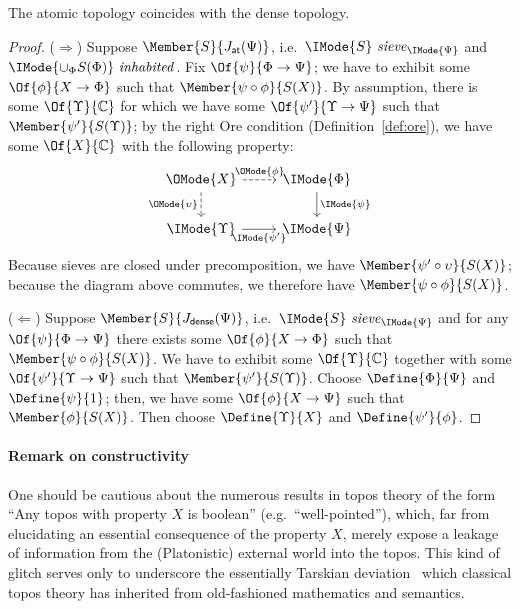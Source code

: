 \documentclass{article}
\newcommand\IsSieve[2]{\IMode{#2}\ \mathit{sieve}_{\IMode{#1}}}
\newcommand\JAtomic{J_{\mathsf{at}}}
\newcommand\JDense{J_{\mathsf{dense}}}
\newcommand\IsInh[1]{\IMode{#1}\ \mathit{inhabited}}
\begin{document}
\begin{lem}\label{lem:atomic-dense}
  The atomic topology coincides with the dense topology.
\end{lem}
\begin{proof}
  ($\Rightarrow$) Suppose $\Member{S}{\JAtomic(\Psi)}$, i.e.\
  $\IsSieve{\Psi}{S}$ and $\IsInh{\cup_\Phi S(\Phi)}$. Fix
  $\Of{\psi}{\Phi\to\Psi}$; we have to exhibit some
  $\Of{\phi}{X\to\Phi}$ such that $\Member{\psi\circ\phi}{S(X)}$.
  By assumption, there is some $\Of{\Upsilon}{\mathbb{C}}$ for which we
  have some $\Of{\psi'}{\Upsilon\to\Psi}$ such that
  $\Member{\psi'}{S(\Upsilon)}$; by the right Ore condition
  (Definition~\ref{def:ore}), we have some $\Of{X}{\mathbb{C}}$ with
  the following property:
  \[
    \begin{tikzcd}
      \OMode{X}
      \arrow[r,dashed,"\OMode{\phi}"]
      \arrow[d,dashed,swap,"\OMode{\upsilon}"]
      &
      \IMode{\Phi}
      \arrow[d,"\IMode{\psi}"]
      \\
      \IMode{\Upsilon}
      \arrow[r,swap,"\IMode{\psi'}"]
      &
      \IMode{\Psi}
    \end{tikzcd}
  \]
  Because sieves are closed under precomposition, we have
  $\Member{\psi'\circ \upsilon}{S(X)}$; because the diagram above
  commutes, we therefore have $\Member{\psi\circ\phi}{S(X)}$.

  ($\Leftarrow$) Suppose $\Member{S}{\JDense(\Psi)}$, i.e.\
  $\IsSieve{\Psi}{S}$ and for any $\Of{\psi}{\Phi\to\Psi}$ there
  exists some $\Of{\phi}{X\to\Phi}$ such that
  $\Member{\psi\circ\phi}{S(X)}$. We have to exhibit some
  $\Of{\Upsilon}{\mathbb{C}}$ together with some
  $\Of{\psi'}{\Upsilon\to\Psi}$ such that
  $\Member{\psi'}{S(\Upsilon)}$.
  Choose $\Define{\Phi}{\Psi}$ and $\Define{\psi}{1}$; then, we have
  some $\Of{\phi}{X\to\Psi}$ such that $\Member{\phi}{S(X)}$. Then
  choose $\Define{\Upsilon}{X}$ and $\Define{\psi'}{\phi}$.
\end{proof}

\paragraph{Remark on constructivity}

One should be cautious about the numerous results in topos theory of
the form ``Any topos with property $X$ is boolean'' (e.g.\
``well-pointed''), which, far from elucidating an essential
consequence of the property $X$, merely expose a leakage of
information from the (Platonistic) external world into the topos. This
kind of glitch serves only to underscore the essentially Tarskian
deviation~\cite{girard:2011} which classical topos theory has
inherited from old-fashioned mathematics and semantics.
\end{document}
